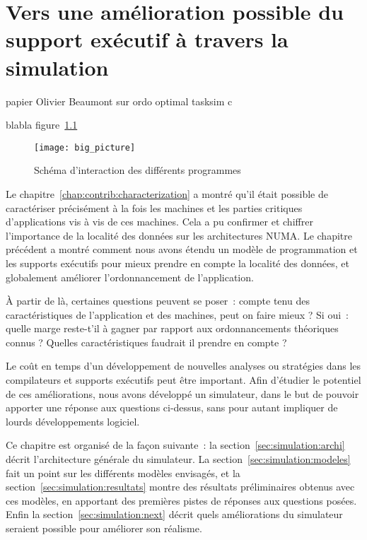 \chapter{Vers une amélioration possible du support exécutif à travers la simulation}\label{chap:simulation}
\chaptertoc

\begin{todo}
  papier Olivier Beaumont sur ordo optimal
  tasksim c
\end{todo}

\begin{todo}
  blabla figure~\ref{fig:simu:big_picture}
\end{todo}

\begin{figure}[h!]
  \centering
  \texttt{[image: big\_picture]}
  \caption{Schéma d'interaction des différents programmes}\label{fig:simu:big_picture}
\end{figure}

Le chapitre~\ref{chap:contrib:characterization} a montré qu'il était possible de caractériser précisément à la fois les machines et les parties critiques d'applications vis à vis de ces machines.
Cela a pu confirmer et chiffrer l'importance de la localité des données sur les architectures NUMA.
Le chapitre précédent a montré comment nous avons étendu un modèle de programmation et les supports exécutifs pour mieux prendre en compte la localité des données, et globalement améliorer l'ordonnancement de l'application.

À partir de là, certaines questions peuvent se poser~: compte tenu des caractéristiques de l'application et des machines, peut on faire mieux ?
Si oui~: quelle marge reste-t'il à gagner par rapport aux ordonnancements théoriques connus ? Quelles caractéristiques faudrait il prendre en compte ?

Le coût en temps d'un développement de nouvelles analyses ou stratégies dans les compilateurs et supports exécutifs peut être important.
Afin d'étudier le potentiel de ces améliorations, nous avons développé un simulateur, dans le but de pouvoir apporter une réponse aux questions ci-dessus, sans pour autant impliquer de lourds développements logiciel.

Ce chapitre est organisé de la façon suivante~: la section~\ref{sec:simulation:archi} décrit l'architecture générale du simulateur.
La section~\ref{sec:simulation:modeles} fait un point sur les différents modèles envisagés, et la section~\ref{sec:simulation:resultats} montre des résultats préliminaires obtenus avec ces modèles, en apportant des premières pistes de réponses aux questions posées.
Enfin la section~\ref{sec:simulation:next} décrit quels améliorations du simulateur seraient possible pour améliorer son réalisme.


